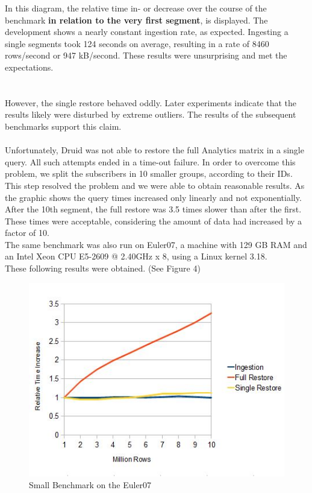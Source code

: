 \documentclass[11pt,singlecolumn]{scrartcl}
\begin{document}
In this diagram, the relative time in- or decrease over the course of the benchmark  \textbf{in relation to the very first segment}, is displayed. The development shows a nearly constant ingestion rate, as expected. Ingesting a single segments took 124 seconds on average, resulting in a rate of 8460 rows/second or 947 kB/second. These results were unsurprising and met the expectations.\\\\\\
However, the single restore behaved oddly. Later experiments indicate that the results likely were disturbed by extreme outliers. The results of the subsequent benchmarks support this claim.\\\\
Unfortunately, Druid was not able to restore the full Analytics matrix in a single query. All such attempts ended in a time-out failure. In order to overcome this problem, we split the subscribers in 10 smaller groups, according to their IDs. This step resolved the problem and we were able to obtain reasonable results.
As the graphic shows the query times increased only linearly and not exponentially. After the 10th segment, the full restore was 3.5 times slower than after the first. These times were acceptable, considering the amount of data had increased by a factor of 10. 
\\[1cm]
The same benchmark was also run on Euler07, a machine with 129 GB RAM  and an Intel Xeon CPU E5-2609 @ 2.40GHz x 8, using a Linux kernel 3.18.\\
These following results were obtained. (See Figure 4)  

\begin{figure}[h]
\includegraphics[scale=1.1]{eul.jpg}
\caption{Small Benchmark on the Euler07}
\end{figure}
\end{document}
